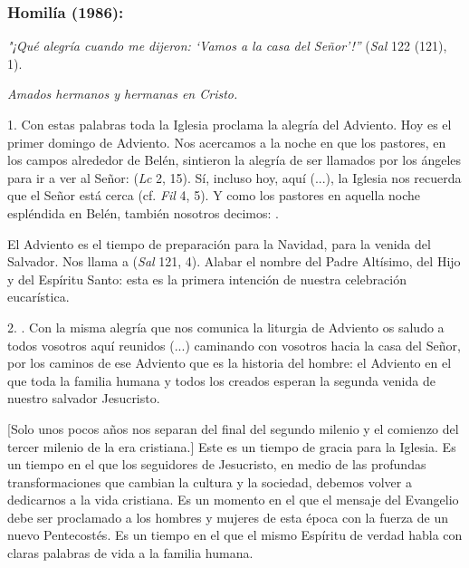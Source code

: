 \subsubsection{Homilía (1986): }


\begin{body}
	\emph{"¡Qué alegría cuando me dijeron: `Vamos a la casa del Señor'!''} (\emph{Sal} 122 (121), 1).
	
	\emph{Amados hermanos y hermanas en Cristo.}
	
	1. Con estas palabras toda la Iglesia proclama la alegría del Adviento. Hoy es el primer domingo de Adviento. Nos acercamos a la noche en que los pastores, en los campos alrededor de Belén, sintieron la alegría de ser llamados por los ángeles para ir a ver al Señor:  (\emph{Lc} 2, 15). Sí, incluso hoy, aquí (...), la Iglesia nos recuerda que el Señor está cerca (cf. \emph{Fil} 4, 5). Y como los pastores en aquella noche espléndida en Belén, también nosotros decimos: .
	
	El Adviento es el tiempo de preparación para la Navidad, para la venida del Salvador. Nos llama a  (\emph{Sal} 121, 4). Alabar el nombre del Padre Altísimo, del Hijo y del Espíritu Santo: esta es la primera intención de nuestra celebración eucarística.
	
	2. . Con la misma alegría que nos comunica la liturgia de Adviento os saludo a todos vosotros aquí reunidos (...) caminando con vosotros hacia la casa del Señor, por los caminos de ese Adviento que es la historia del hombre: el Adviento en el que toda la familia humana y todos los creados esperan la segunda venida de nuestro salvador Jesucristo.
	
	{[}Solo unos pocos años nos separan del final del segundo milenio y el comienzo del tercer milenio de la era cristiana.{]} Este es un tiempo de gracia para la Iglesia. Es un tiempo en el que los seguidores de Jesucristo, en medio de las profundas transformaciones que cambian la cultura y la sociedad, debemos volver a dedicarnos a la vida cristiana. Es un momento en el que el mensaje del Evangelio debe ser proclamado a los hombres y mujeres de esta época con la fuerza de un nuevo Pentecostés. Es un tiempo en el que el mismo Espíritu de verdad habla con claras palabras de vida a la familia humana.
	

\end{body}

